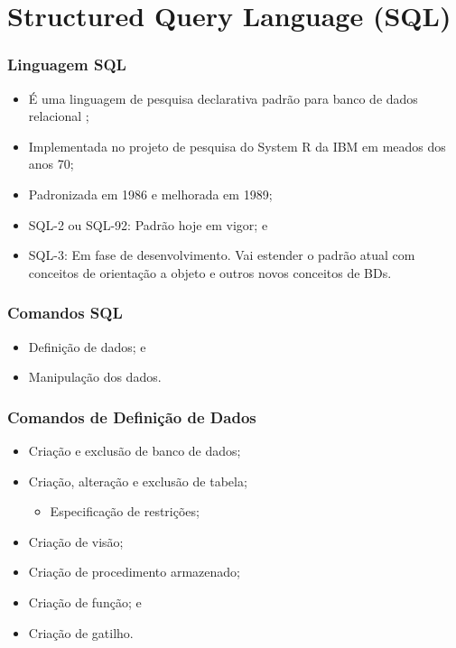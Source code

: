 \documentclass{beamer}
\begin{document}
\section{Structured Query Language (SQL)}

\begin{frame}
\frametitle{Linguagem SQL}

\begin{itemize}
	\item É uma linguagem de pesquisa declarativa padrão para banco de dados relacional ;
	\item Implementada no projeto de pesquisa do System R da IBM em
	meados dos anos 70;
	\item Padronizada em 1986 e melhorada em 1989;
	\item SQL-2 ou SQL-92: Padrão hoje em vigor; e
	\item SQL-3: Em fase de desenvolvimento. Vai estender o padrão atual com
	conceitos de orientação a objeto e outros novos conceitos de BDs.
\end{itemize}
\end{frame}

\begin{frame}
\frametitle{Comandos SQL}

\begin{itemize}
	\item Definição de dados; e
	\item Manipulação dos dados.
\end{itemize}
\end{frame}

\begin{frame}
\frametitle{Comandos de Definição de Dados}

\begin{itemize}
	\item Criação e exclusão de banco de dados;
	\item Criação, alteração e exclusão de tabela;
	\begin{itemize}
		\item Especificação de restrições;
	\end{itemize}
	\item Criação de visão;
	\item Criação de procedimento armazenado;
	\item Criação de função; e
	\item Criação de gatilho.
\end{itemize}
\end{frame}
\end{document}

